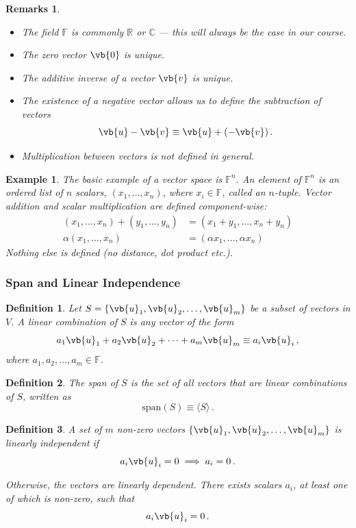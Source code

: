 \documentclass{article}
\theoremstyle{plain}\theoremheaderfont{\normalfont\itshape}\theorembodyfont{\rmfamily}\theoremseparator{.}\newtheorem*{rem}{Remark}\newtheorem*{ex}{Example}\newtheorem*{proof}{Proof}\newtheorem*{altp}{Alternative proof}
\theoremstyle{plain}\theoremheaderfont{\normalfont\bfseries}\theorembodyfont{\rmfamily}\theoremseparator{.}\newtheorem{thm}{Theorem}[section]\newtheorem{lem}[thm]{Lemma}\newtheorem{prop}[thm]{Proposition}\newtheorem*{cor}{Corollary}\newtheorem{defn}[thm]{Definition}\newtheorem{clm}[thm]{Claim}\newtheorem{clminproof}{Claim}
\theoremstyle{break}\theoremheaderfont{\normalfont\itshape}\theorembodyfont{\rmfamily}\theoremseparator{.\medskip}\newtheorem*{proofskip}{Proof}\newtheorem*{exs}{Examples}\newtheorem*{rems}{Remarks}
\theoremstyle{break}\theoremheaderfont{\normalfont\bfseries}\theorembodyfont{\rmfamily}\theoremseparator{.\medskip}\newtheorem{lemskip}[thm]{Lemma}\newtheorem{defnskip}[thm]{Definition}\newtheorem{propskip}[thm]{Proposition}\newtheorem{thmskip}[thm]{Theorem}
\numberwithin{equation}{section}
\begin{document}
	\begin{rems}
		\begin{itemize}[topsep=0pt]
			\item The field \(\mathbb{F}\) is commonly \(\mathbb{R}\) or \(\mathbb{C}\) --- this will always be the case in our course.
			\item The zero vector \(\vb{0}\) is unique.
			\item The additive inverse of a vector \(\vb{v}\) is unique.
			\item The existence of a negative vector allows us to define the subtraction of vectors
			\[\vb{u}-\vb{v}\equiv\vb{u}+(-\vb{v})\,.\]
			\item Multiplication between vectors is not defined in general.
		\end{itemize}
	\end{rems}
	
	\begin{ex}
		The basic example of a vector space is \(\mathbb{F}^n\). An element of \(\mathbb{F}^n\) is an ordered list of \(n\) scalars, \((x_1,\dots,x_n)\), where \(x_i\in \mathbb{F}\), called an \(n\)-tuple. Vector addition and scalar multiplication are defined component-wise:
		\begin{align*}
			(x_1,\dots,x_n)+(y_1,\dots,y_n)&=(x_1+y_1,\dots,x_n+y_n)\\
			\alpha(x_1,\dots,x_n)&=(\alpha x_1,\dots,\alpha x_n)
		\end{align*}
		Nothing else is defined (no distance, dot product \textit{etc.}).
	\end{ex}
	
	\subsubsection{Span and Linear Independence}
	\begin{defn}
		Let \(S=\{\vb{u}_1,\vb{u}_2,\dots,\vb{u}_m\}\) be a subset of vectors in \(V\). A \textit{linear combination} of \(S\) is any vector of the form
		\[a_1\vb{u}_1+a_2\vb{u}_2+\dots+a_m\vb{u}_m\equiv a_i\vb{u}_i\,,\]
		where \(a_1,a_2,\dots,a_m\in\mathbb{F}\).
	\end{defn}
	\begin{defn}
		The \textit{span} of \(S\) is the set of all vectors that are linear combinations of \(S\), written as
		\[\mathrm{span}(S)\equiv\langle S\rangle\,.\]
	\end{defn}
	\begin{defn}
		A set of \(m\) non-zero vectors \(\{\vb{u}_1,\vb{u}_2,\dots,\vb{u}_m\}\) is \textit{linearly independent} if
		\[a_i\vb{u}_i=0\implies a_i=0\,.\]
		
		Otherwise, the vectors are \textit{linearly dependent}. There exists scalars \(a_i\), at least one of which is non-zero, such that
		\[a_i\vb{u}_i=0\,.\]
	\end{defn}
	
\end{document}
